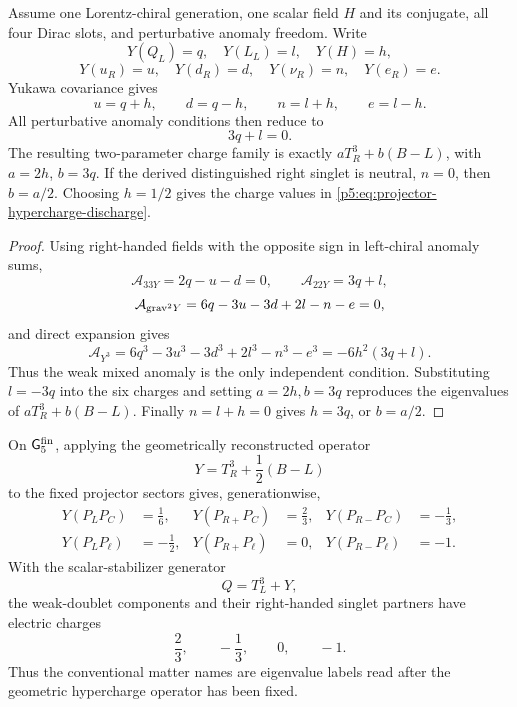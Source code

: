 \documentclass[11pt,a4paper]{article}
\begin{document}
\begin{theorem}
\label{p5:thm:yukawa-anomaly-hypercharge-crosscheck}
Assume one Lorentz-chiral generation, one scalar field \(H\) and its
conjugate, all four Dirac slots, and perturbative anomaly freedom.  Write
\[
Y(Q_L)=q,\quad Y(L_L)=l,\quad Y(H)=h,
\]
\[
Y(u_R)=u,\quad Y(d_R)=d,\quad
Y(\nu_R)=n,\quad Y(e_R)=e.
\]
Yukawa covariance gives
\[
u=q+h,\qquad d=q-h,\qquad
n=l+h,\qquad e=l-h.
\]
All perturbative anomaly conditions then reduce to
\[
3q+l=0.
\]
The resulting two-parameter charge family is exactly
\(aT_R^3+b(B-L)\), with \(a=2h\), \(b=3q\).  If the derived distinguished right singlet is
neutral, \(n=0\), then \(b=a/2\).  Choosing \(h=1/2\) gives the charge values
in \eqref{p5:eq:projector-hypercharge-discharge}.
\end{theorem}

\begin{proof}
Using right-handed fields with the opposite sign in left-chiral anomaly
sums,
\[
\mathcal A_{33Y}=2q-u-d=0,
\qquad
\mathcal A_{22Y}=3q+l,
\]
\[
\mathcal A_{{\rm grav}^2Y}
=6q-3u-3d+2l-n-e=0,
\]
and direct expansion gives
\[
\mathcal A_{Y^3}
=6q^3-3u^3-3d^3+2l^3-n^3-e^3
=-6h^2(3q+l).
\]
Thus the weak mixed anomaly is the only independent condition.  Substituting
\(l=-3q\) into the six charges and setting \(a=2h,b=3q\) reproduces the
eigenvalues of \(aT_R^3+b(B-L)\).  Finally \(n=l+h=0\) gives \(h=3q\), or
\(b=a/2\).
\end{proof}



\begin{corollary}
\label{p5:cor:projector-hypercharge-electric-discharge}
On \(\mathsf G_5^{\rm fin}\), applying the geometrically
reconstructed operator
\[
Y=T_R^3+\frac12(B-L)
\]
to the fixed projector sectors gives, generationwise,
\begin{equation}
\label{p5:eq:projector-hypercharge-discharge}
\begin{aligned}
Y(P_LP_C)&=\frac16,
&
Y(P_{R+}P_C)&=\frac23,
&
Y(P_{R-}P_C)&=-\frac13,\\
Y(P_LP_\ell)&=-\frac12,
&
Y(P_{R+}P_\ell)&=0,
&
Y(P_{R-}P_\ell)&=-1.
\end{aligned}
\end{equation}
With the scalar-stabilizer generator
\[
Q=T_L^3+Y,
\]
the weak-doublet components and their right-handed singlet partners have electric charges
\[
\frac23,
\qquad
-\frac13,
\qquad
0,
\qquad
-1.
\]
Thus the conventional matter names are eigenvalue labels read after the
geometric hypercharge operator has been fixed.
\end{corollary}
\end{document}
